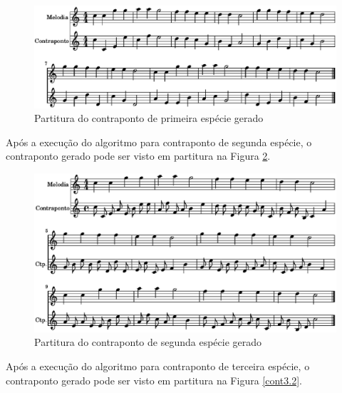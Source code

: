     \begin{figure}[htb]
      \centering
      \includegraphics[scale=0.6]{figuras/cont1.2.eps}
      \caption{Partitura do contraponto de primeira espécie gerado}
      \label{cont1.2}
    \end{figure}

    Após a execução do algoritmo para contraponto de segunda espécie, o contraponto gerado pode ser visto em partitura na Figura \ref{cont2.2}.

        \begin{figure}[htb]
          \centering
          \includegraphics[scale=0.6]{figuras/cont2.2.eps}
          \caption{Partitura do contraponto de segunda espécie gerado}
          \label{cont2.2}
        \end{figure}

    Após a execução do algoritmo para contraponto de terceira espécie, o contraponto gerado pode ser visto em partitura na Figura \ref{cont3.2}.


